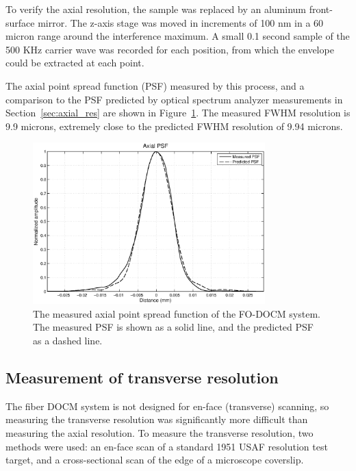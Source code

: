 
To verify the axial resolution, the sample was replaced by an aluminum front-surface mirror. The z-axis stage was moved in increments of 100 nm in a 60 micron range around the interference maximum. A small 0.1 second sample of the 500 KHz carrier wave was recorded for each position, from which the envelope could be extracted at each point.

The axial point spread function (PSF) measured by this process, and a comparison to the PSF predicted by optical spectrum analyzer measurements in Section~\ref{sec:axial_res} are shown in Figure~\ref{fig:psf_comparison}. The measured FWHM resolution is 9.9 microns, extremely close to the predicted FWHM resolution of 9.94 microns.

\begin{figure}[h!]
\centering
\includegraphics[width=0.8\textwidth]{Images/Results/psf-aom2.eps}
\caption[The measured axial point spread function.]{The measured axial point spread function of the FO-DOCM system. The measured PSF is shown as a solid line, and the predicted PSF as a dashed line.\label{fig:psf_comparison}}
\end{figure}

\subsection{Measurement of transverse resolution}

The fiber DOCM system is not designed for en-face (transverse) scanning, so measuring the transverse resolution was significantly more difficult than measuring the axial resolution. To measure the transverse resolution, two methods were used: an en-face scan of a standard 1951 USAF resolution test target, and a cross-sectional scan of the edge of a microscope coverslip.

